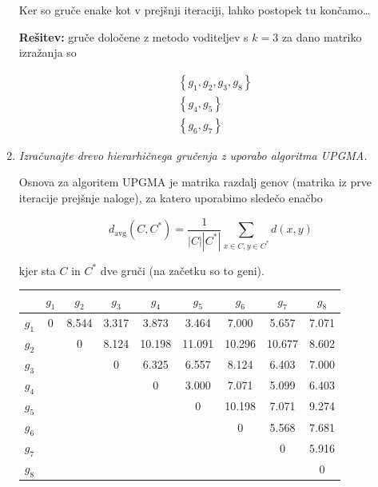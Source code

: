 \documentclass{article}
\begin{document}
\begin{enumerate}
		Ker so gruče enake kot v prejšnji iteraciji, lahko postopek tu končamo\dots

		\textbf{Rešitev:} gruče določene z metodo voditeljev s $k=3$ za dano matriko
		izražanja so

		\begin{align*}
				&\left\{ g_1, g_2, g_3, g_8 \right\}  \\
				&\left\{ g_4, g_5 \right\}  \\
				&\left\{ g_6, g_7 \right\}
		\end{align*}

	\item \textit{Izračunajte drevo hierarhičnega gručenja z uporabo algoritma UPGMA.}

		Osnova za algoritem UPGMA je matrika razdalj genov (matrika iz prve iteracije
		prejšnje naloge), za katero uporabimo sledečo enačbo

		$$
		d_{\text{avg}}(C, C^*) = \frac{ 1 }{ |C| |C^*| } \sum_{x\in C, y\in C^*} d(x,y)
		$$

		kjer sta $C$ in $C^*$ dve gruči (na začetku so to geni).

		\begin{center}
			\begin{tabular}{c||c|c|c|c|c|c|c|c|}
				& $g_1$ & $g_2$ & $g_3$ & $g_4$ & $g_5$ & $g_6$ & $g_7$ & $g_8$ \\
				\hline
				\hline
				$g_1$ & 0     & 8.544 & 3.317 & 3.873 & 3.464 & 7.000 & 5.657 & 7.071 \\
				\hline
				$g_2$ &       & 0     & 8.124 & 10.198 & 11.091 & 10.296 & 10.677 & 8.602 \\
				\hline
				$g_3$ &       &       & 0     & 6.325 & 6.557  & 8.124  & 6.403 & 7.000 \\
				\hline
				$g_4$ &       &       &       & 0     & 3.000  & 7.071  & 5.099 & 6.403 \\
				\hline
				$g_5$ &       &       &       &       & 0      & 10.198 & 7.071 & 9.274 \\
				\hline
				$g_6$ &       &       &       &       &        & 0      & 5.568 & 7.681 \\
				\hline
				$g_7$ &       &       &       &       &        &        & 0     & 5.916 \\
				\hline
				$g_8$ &       &       &       &       &        &        &        & 0     \\
			\end{tabular}
		\end{center}


\end{enumerate}
\end{document}
